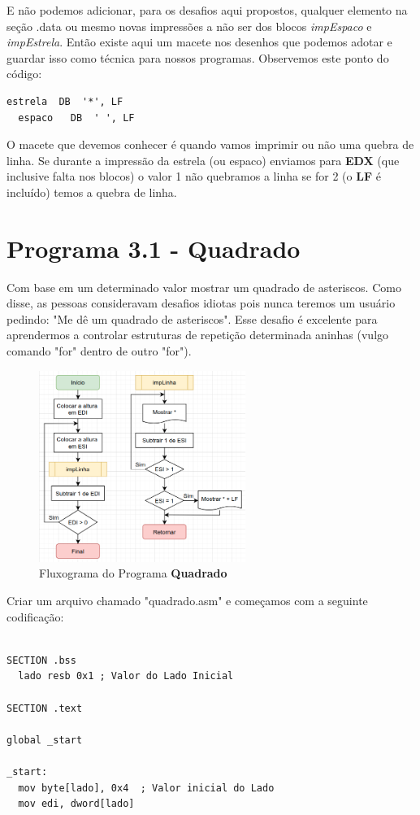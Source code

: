 E não podemos adicionar, para os desafios aqui propostos, qualquer elemento na seção .data ou mesmo novas impressões a não ser dos blocos \textit{impEspaco} e \textit{impEstrela}. Então existe aqui um macete nos desenhos que podemos adotar e guardar isso como técnica para nossos programas. Observemos este ponto do código:
\begin{lstlisting}[]
  estrela  DB  '*', LF
  espaco   DB  ' ', LF
\end{lstlisting}

O macete que devemos conhecer é quando vamos imprimir ou não uma quebra de linha. Se durante a impressão da estrela (ou espaco) enviamos para \textbf{EDX} (que inclusive falta nos blocos) o valor 1 não quebramos a linha se for 2 (o \textbf{LF} é incluído) temos a quebra de linha.

\section{Programa 3.1 - Quadrado}
Com base em um determinado valor mostrar um quadrado de asteriscos. Como disse, as pessoas consideravam desafios idiotas pois nunca teremos um usuário pedindo: "Me dê um quadrado de asteriscos". Esse desafio é excelente para aprendermos a controlar estruturas de repetição determinada aninhas (vulgo comando "for" dentro de outro "for"). 
\begin{figure}[H]
	\centering
	\includegraphics[width=0.6\textwidth]{Pictures/cap03/programa31}
	\caption{Fluxograma do Programa \textbf{Quadrado}}
\end{figure}

Criar um arquivo chamado "quadrado.asm" e começamos com a seguinte codificação:
\begin{lstlisting}[]
%include 'bibliotecaE.inc'

SECTION .bss
  lado resb 0x1 ; Valor do Lado Inicial

SECTION .text

global _start

_start:
  mov byte[lado], 0x4  ; Valor inicial do Lado
  mov edi, dword[lado]
\end{lstlisting}

